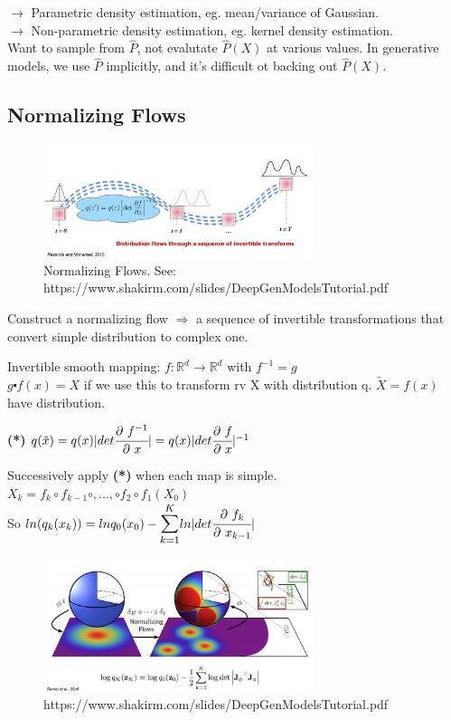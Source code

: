 \documentclass[12pt,a4paper]{article}
\begin{document}
$\rightarrow$ Parametric density estimation, eg. mean/variance of Gaussian. \\
$\rightarrow$ Non-parametric density estimation, eg. kernel density estimation. \\
Want to sample from $\hat{P}$, not evalutate $\hat{P}(X)$ at various values. In generative models, we use $\hat{P}$ implicitly, and it's difficult ot backing out $\hat{P}(X)$.

\subsection{Normalizing Flows}
\begin{figure}[!ht]
    \centering
    \includegraphics[width=0.7\textwidth]{fig/norm_flow.jpg}
    \caption{Normalizing Flows. See: https://www.shakirm.com/slides/DeepGenModelsTutorial.pdf}
\end{figure}

Construct a normalizing flow $\Rightarrow$ a sequence of invertible transformations that convert simple distribution to complex one. 

Invertible smooth mapping:
$f: \mathbb{R}^d\rightarrow \mathbb{R}^d$
with $f^{-1}=g$ \\
$g\centerdot f(x)=X$ if we use this to transform rv X with distribution q.
$\tilde{X}=f(x)$ have distribution. 

\textbf{(*)} $q(\tilde{x})=q(x)|det\cfrac{\partial\ f^{-1}}{\partial\ x}|=q(x)|det\cfrac{\partial\ f}{\partial\ x}|^{-1}$

Successively apply \textbf{(*)} when each map is simple. \\
$X_k=f_k \circ f_{k-1} \circ, ..., \circ f_2 \circ f_1 (X_0)$\\
So $ln(q_k(x_k))=ln q_0(x_0)-\bsum{k=1}{K}ln|det\pfrac{f_k}{x_{k-1}}|$

\begin{figure}[!ht]
    \centering
    \includegraphics[width=0.7\textwidth]{fig/norm_flow_eq.jpg}
    \caption{https://www.shakirm.com/slides/DeepGenModelsTutorial.pdf}
\end{figure}
\end{document}
